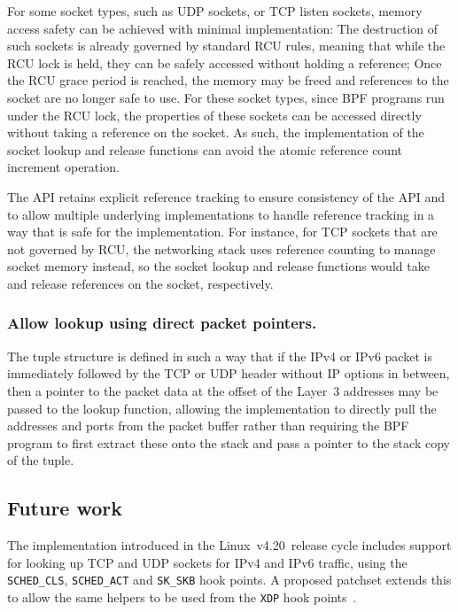 \documentclass[10pt,sigconf,authorversion]{lpc}
\newcommand\linuxversion{{v4.20}}
\begin{document}
For some socket types, such as UDP sockets, or TCP listen sockets, memory
access safety can be achieved with minimal implementation: The destruction of
such sockets is already governed by standard RCU rules, meaning that while the
RCU lock is held, they can be safely accessed without holding a reference; Once
the RCU grace period is reached, the memory may be freed and references to the
socket are no longer safe to use. For these socket types, since BPF programs
run under the RCU lock, the properties of these sockets can be accessed
directly without taking a reference on the socket. As such, the implementation
of the socket lookup and release functions can avoid the atomic reference count
increment operation.

The API retains explicit reference tracking to ensure consistency of the API
and to allow multiple underlying implementations to handle reference tracking
in a way that is safe for the implementation. For instance, for  TCP sockets
that are not governed by RCU, the networking stack uses reference counting to
manage socket memory instead, so the socket lookup and release functions would
take and release references on the socket, respectively.

\subsubsection{Allow lookup using direct packet pointers.}

The tuple structure is defined in such a way that if the IPv4 or IPv6 packet is
immediately followed by the TCP or UDP header without IP options in between,
then a pointer to the packet data at the offset of the Layer~3 addresses may be
passed to the lookup function, allowing the implementation to directly pull the
addresses and ports from the packet buffer rather than requiring the BPF
program to first extract these onto the stack and pass a pointer to the stack
copy of the tuple.

\subsection{Future work}

The implementation introduced in the Linux~\linuxversion~release cycle includes
support for looking up TCP and UDP sockets for IPv4 and IPv6 traffic, using the
\verb+SCHED_CLS+, \verb+SCHED_ACT+ and \verb+SK_SKB+ hook points. A proposed
patchset extends this to allow the same helpers to be used from the \verb+XDP+
hook points~\cite{sk-lookup-xdp}.
\end{document}
